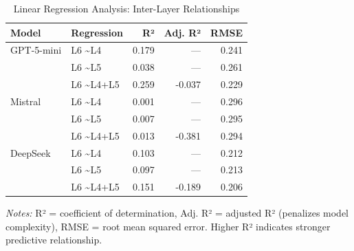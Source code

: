 
\begin{table}[t]
\centering
\caption{Linear Regression Analysis: Inter-Layer Relationships}
\label{tab:regression}
\small
\begin{tabular}{llrrr}
\toprule
\textbf{Model} & \textbf{Regression} & \textbf{R²} & \textbf{Adj. R²} & \textbf{RMSE} \\
\midrule
GPT-5-mini      & L6 \sim L4 & 0.179 & --- & 0.241 \\
                & L6 \sim L5 & 0.038 & --- & 0.261 \\
                & L6 \sim L4+L5 & 0.259 & -0.037 & 0.229 \\
\midrule
Mistral         & L6 \sim L4 & 0.001 & --- & 0.296 \\
                & L6 \sim L5 & 0.007 & --- & 0.295 \\
                & L6 \sim L4+L5 & 0.013 & -0.381 & 0.294 \\
\midrule
DeepSeek        & L6 \sim L4 & 0.103 & --- & 0.212 \\
                & L6 \sim L5 & 0.097 & --- & 0.213 \\
                & L6 \sim L4+L5 & 0.151 & -0.189 & 0.206 \\
\bottomrule
\end{tabular}
\vspace{0.1cm}

\small
\textit{Notes:} R² = coefficient of determination, Adj. R² = adjusted R² (penalizes model complexity),
RMSE = root mean squared error. Higher R² indicates stronger predictive relationship.
\end{table}
